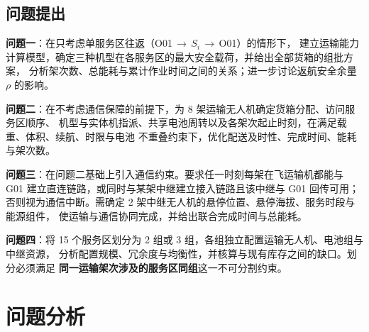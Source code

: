 \documentclass[12pt,a4paper,fontset=windows]{ctexart}
\begin{document}
\subsection{问题提出}
\textbf{问题一}：在只考虑单服务区往返（O01\,$\to$\,$S_i$\,$\to$\,O01）的情形下，
建立运输能力计算模型，确定三种机型在各服务区的最大安全载荷，并给出全部货箱的组批方案，
分析架次数、总能耗与累计作业时间之间的关系；进一步讨论返航安全余量 $\rho$ 的影响。

\textbf{问题二}：在不考虑通信保障的前提下，为 8 架运输无人机确定货箱分配、访问服务区顺序、
机型与实体机指派、共享电池周转以及各架次起止时刻，在满足载重、体积、续航、时限与电池
不重叠约束下，优化配送及时性、完成时间、能耗与架次数。

\textbf{问题三}：在问题二基础上引入通信约束。要求任一时刻每架在飞运输机都能与 G01
建立直连链路，或同时与某架中继建立接入链路且该中继与 G01 回传可用；
否则视为通信中断。需确定 2 架中继无人机的悬停位置、悬停海拔、服务时段与能源组件，
使运输与通信协同完成，并给出联合完成时间与总能耗。

\textbf{问题四}：将 15 个服务区划分为 2 组或 3 组，各组独立配置运输无人机、电池组与中继资源，
分析配置规模、冗余度与均衡性，并核算与现有库存之间的缺口。划分必须满足
\textbf{同一运输架次涉及的服务区同组}这一不可分割约束。

\section{问题分析}
\end{document}
